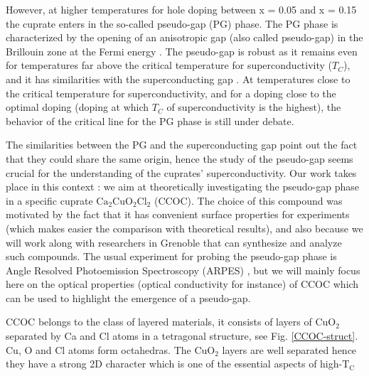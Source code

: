 \documentclass[12pt]{article}
\begin{document}
\begin{multicols}{2}
\begin{center}
    \label{cuprate_phase_diag}
\end{center}
However, at higher temperatures for hole doping between x = 0.05 and x = 0.15 
the cuprate enters in the so-called pseudo-gap (PG) phase. The PG phase is 
characterized by the opening of an anisotropic gap (also called pseudo-gap) in 
the Brillouin zone at the Fermi energy \cite{alloul-PGdiscovery}. The pseudo-gap 
is robust as it remains even for temperatures far above the critical temperature 
for superconductivity ($T_{C}$), and it has similarities with the 
superconducting gap \cite{Ronning-CCOCARPES}. At temperatures close to the 
critical temperature for superconductivity, and for a doping close to the 
optimal doping (doping at which $T_{C}$ of superconductivity is the highest), 
the behavior of the critical line for the PG phase is still under debate. \par 
The similarities between the PG and the superconducting gap point out the fact 
that they could share the same origin, hence the study of the pseudo-gap seems 
crucial for the understanding of the cuprates' superconductivity. Our work takes 
place in this context : we aim at theoretically investigating the pseudo-gap 
phase in a specific cuprate $\mathrm{Ca_{2}CuO_{2}Cl_{2}}$ (CCOC). The choice of 
this compound was motivated by the fact that it has convenient surface 
properties for experiments\cite{Ronning-CCOCARPES} (which makes easier the 
comparison with theoretical results), and also because we will work along with 
researchers in Grenoble that can synthesize and analyze such compounds. The 
usual experiment for probing the pseudo-gap phase is Angle Resolved 
Photoemission Spectroscopy (ARPES) \cite{damscelli-cuprates-review}, but we will 
mainly focus here on the optical properties (optical conductivity for instance) 
of CCOC which can be used to highlight the emergence of a pseudo-gap. \par CCOC 
belongs to the class of layered materials, it consists of layers of 
$\mathrm{CuO_{2}}$ separated by Ca and Cl atoms in a tetragonal structure, see 
Fig. \ref{CCOC-struct}. Cu, O and Cl atoms form octahedras. The 
$\mathrm{CuO_{2}}$ layers are well separated hence they have a strong 2D 
character which is one of the essential aspects of high-$\mathrm{T_{C}}$ 

\end{multicols}
\end{document}
